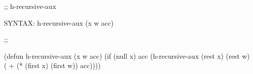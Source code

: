 \begin{aibox}{\function}
;; h-recursive-aux

SYNTAX: h-recursive-aux (x w acc)
\end{aibox}

\begin{aibox}{\examples}

\end{aibox}

\begin{aibox}{\comments}

\end{aibox}
\begin{aibox}{\answers}

\end{aibox}
\begin{aibox}{\othercomments}

\end{aibox}
\begin{aibox}{\pseudocode}

\end{aibox}
\begin{aibox}{\code}

;;%

(defun h-recursive-aux (x w acc)
		(if (null x)
			acc
		(h-recursive-aux (rest x) (rest w) ( + (* (first x)  (first w)) acc))))
\end{aibox}
